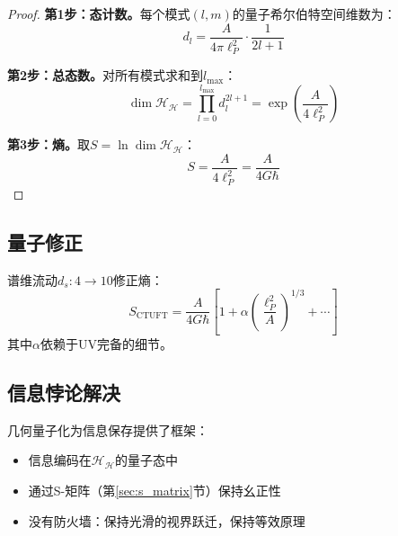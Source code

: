\begin{proof}
\textbf{第1步：态计数。}每个模式$(l, m)$的量子希尔伯特空间维数为：
\begin{equation}
    d_l = \frac{A}{4\pi \ell_P^2} \cdot \frac{1}{2l + 1}
\end{equation}

\textbf{第2步：总态数。}对所有模式求和到$l_{\max}$：
\begin{equation}
    \dim \mathcal{H}_{\mathcal{H}} = \prod_{l=0}^{l_{\max}} d_l^{2l+1} = \exp\left(\frac{A}{4\ell_P^2}\right)
\end{equation}

\textbf{第3步：熵。}取$S = \ln \dim \mathcal{H}_{\mathcal{H}}$：
\begin{equation}
    S = \frac{A}{4\ell_P^2} = \frac{A}{4G\hbar}
\end{equation}
\end{proof}

\subsection{量子修正}

谱维流动$d_s: 4 \to 10$修正熵：
\begin{equation}
    S_{\text{CTUFT}} = \frac{A}{4G\hbar} \left[1 + \alpha \left(\frac{\ell_P^2}{A}\right)^{1/3} + \cdots\right]
\end{equation}
其中$\alpha$依赖于UV完备的细节。

\subsection{信息悖论解决}

几何量子化为信息保存提供了框架：
\begin{itemize}
    \item 信息编码在$\mathcal{H}_{\mathcal{H}}$的量子态中
    \item 通过S-矩阵（第\ref{sec:s_matrix}节）保持幺正性
    \item 没有防火墙：保持光滑的视界跃迁，保持等效原理
\end{itemize}
